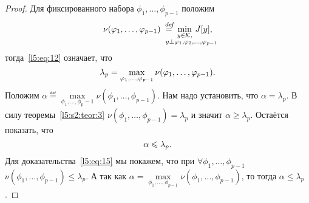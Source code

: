 \begin{proof}
	Для фиксированного набора $\phi_1,\ldots,\phi_{p-1}$ положим
	\begin{equation}
		\label{l5:eq:13}
		\hfill\nu(\phi_1,\ldots,\phi_{p-1})\eqdef\min\limits_{\substack{y\in\K,\\\lefteqn{\scriptstyle \hspace*{-0.8cm}y\perp\phi_1,\phi_2,\ldots,\phi_{p-1}}}}\,J[y],\hfill
	\end{equation}
	тогда~\eqref{l5:eq:12} означает, что
	\begin{equation}
		\label{l5:eq:14}
		\hfill\lambda_p=\max\limits_{\phi_1,\ldots,\phi_{p-1}}\nu(\phi_1,\ldots,\phi_{p-1}).\hfill
	\end{equation}
	Положим $\displaystyle\alpha\eqdef\max\limits_{\phi_1,\ldots,\phi_p-1}\nu(\phi_1,\ldots,\phi_{p-1})$. Нам надо установить, что $\alpha=\lambda_p$. В силу теоремы~\ref{l5:s2:teor:3} $\nu(\phi_1,\ldots,\phi_{p-1})=\lambda_p$ и значит $\alpha\geqslant\lambda_p$. Остаётся показать, что
	\begin{equation}
		\label{l5:eq:15}
		\hfill\alpha\leqslant\lambda_p.\hfill
	\end{equation} 
	Для доказательства~\eqref{l5:eq:15} мы покажем, что при $\forall\phi_1,\ldots,\phi_{p-1}$  $\nu(\phi_1,\ldots,\phi_{p-1})\leqslant\lambda_p$. А так как $\alpha=\max\limits_{\phi_1,\ldots,\phi_{p-1}}\nu(\phi_1,\ldots,\phi_{p-1})$, то тогда $\alpha\leqslant\lambda_p$.
	

\end{proof}
